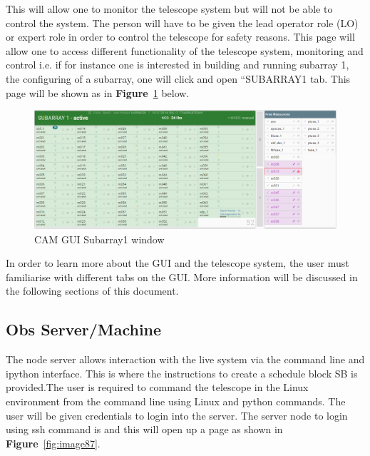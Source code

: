 This will allow one to monitor the telescope system but will not be able to control the system. The person will have to be given the lead operator role (LO) or expert role in order to control the telescope for safety reasons. This page will allow one to access different functionality of the telescope system, monitoring and control i.e. if for instance one is interested in building and running subarray 1, the configuring of a subarray, one will click and open “SUBARRAY1 tab. This page will be shown as in \textbf{Figure}~\ref{fig:image38} below.

\begin{figure}[!thb]
	\centering
	\includegraphics[scale=0.3]{Chapters/images/image38.png}
	
	\caption{CAM GUI Subarray1 window}
	\label{fig:image38}
\end{figure}




In order to learn more about the GUI and the telescope system, the user must familiarise with different tabs on the GUI. More information will be discussed in the following sections of this document. 

\subsection{Obs Server/Machine}
The node server  allows interaction with the live system via the command line and ipython interface. This is where the instructions to create a schedule block SB is provided.The user is required to command the telescope in the Linux environment from the command line using Linux and python commands. 
\clearpage
The user will be given credentials to login into the server. The server node to login using ssh command is  and this will open up a page as shown in \textbf{Figure}~\ref{fig:image87}.

